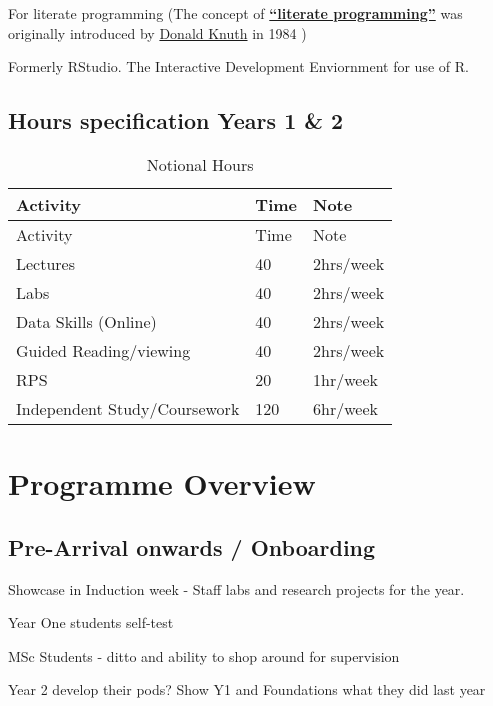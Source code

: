 \documentclass[
  11pt,
  letterpaper,
  oneside,
  open=any]{scrbook}
\begin{document}
For literate programming (The concept of
\href{https://en.wikipedia.org/wiki/Literate_programming}{\textbf{``literate
programming''}} was originally introduced by
\href{http://www.literateprogramming.com/knuthweb.pdf}{Donald Knuth} in
1984 )

Formerly RStudio. The Interactive Development Enviornment for use of R.

\hypertarget{hours-specification-years-1-2}{%
\subsection{Hours specification Years 1 \&
2}\label{hours-specification-years-1-2}}

\begin{longtable}[]{@{}lll@{}}
\caption{Notional Hours}\tabularnewline
\toprule()
Activity & Time & Note \\
\midrule()
\endfirsthead
\toprule()
Activity & Time & Note \\
\midrule()
\endhead
Lectures & 40 & 2hrs/week \\
Labs & 40 & 2hrs/week \\
Data Skills (Online) & 40 & 2hrs/week \\
Guided Reading/viewing & 40 & 2hrs/week \\
RPS & 20 & 1hr/week \\
Independent Study/Coursework & 120 & 6hr/week \\
\bottomrule()
\end{longtable}

\hypertarget{programme-overview}{%
\section{Programme Overview}\label{programme-overview}}

\hypertarget{pre-arrival-onwards-onboarding}{%
\subsection{Pre-Arrival onwards /
Onboarding}\label{pre-arrival-onwards-onboarding}}

Showcase in Induction week - Staff labs and research projects for the
year.

Year One students self-test

MSc Students - ditto and ability to shop around for supervision

Year 2 develop their pods? Show Y1 and Foundations what they did last
year
\end{document}
